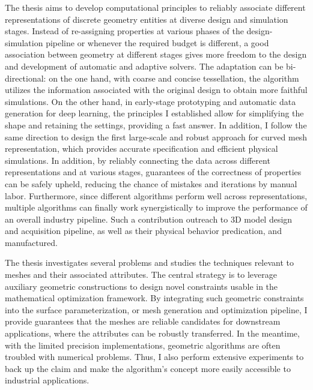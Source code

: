 The thesis aims to develop computational principles to reliably associate different representations of discrete geometry entities at diverse design and simulation stages. Instead of re-assigning properties at various phases of the design-simulation pipeline or whenever the required budget is different, a good association between geometry at different stages gives more freedom to the design and development of automatic and adaptive solvers. The adaptation can be bi-directional: on the one hand, with coarse and concise tessellation, the algorithm utilizes the information associated with the original design to obtain more faithful simulations. On the other hand, in early-stage prototyping and automatic data generation for deep learning, the principles I established allow for simplifying the shape and retaining the settings, providing a fast answer. In addition, I follow the same direction to design the first large-scale and robust approach for curved mesh representation, which provides accurate specification and efficient physical simulations.
In addition, by reliably connecting the data across different representations and at various stages, guarantees of the correctness of properties can be safely upheld, reducing the chance of mistakes and iterations by manual labor. 
Furthermore,  since different algorithms perform well across representations, multiple algorithms can finally work synergistically to improve the performance of an overall industry pipeline.
Such a contribution outreach to 3D model design and acquisition pipeline, as well as their physical behavior predication, and manufactured.

The thesis investigates several problems and studies the techniques relevant to meshes and their associated attributes. The central strategy is to leverage auxiliary geometric constructions to design novel constraints usable in the mathematical optimization framework. 
By integrating such geometric constraints into the surface parameterization, or mesh generation and optimization pipeline, I provide guarantees that the meshes are reliable candidates for downstream applications, where the attributes can be robustly transferred.
In the meantime, with the limited precision implementations, geometric algorithms are often troubled with numerical problems. Thus, I also perform extensive experiments to back up the claim and make the algorithm's concept more easily accessible to industrial applications.


